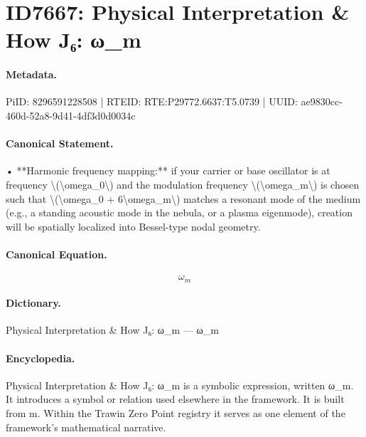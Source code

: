 \section*{ID7667: Physical Interpretation \& How J₆: ω\_m}
\paragraph{Metadata.}
PiID: 8296591228508 | RTEID: RTE:P29772.6637:T5.0739 | UUID: ae9830cc-460d-52a8-9d41-4df3d0d0034c

\paragraph{Canonical Statement.}
• **Harmonic frequency mapping:** if your carrier or base oscillator is at frequency \textbackslash{}(\textbackslash{}omega\_0\textbackslash{}) and the modulation frequency \textbackslash{}(\textbackslash{}omega\_m\textbackslash{}) is chosen such that \textbackslash{}(\textbackslash{}omega\_0 + 6\textbackslash{}omega\_m\textbackslash{}) matches a resonant mode of the medium (e.g., a standing acoustic mode in the nebula, or a plasma eigenmode), creation will be spatially localized into Bessel-type nodal geometry.

\paragraph{Canonical Equation.}
\[
\omega_m
\]

\paragraph{Dictionary.}
Physical Interpretation \& How J₆: ω\_m — ω\_m

\paragraph{Encyclopedia.}
Physical Interpretation \& How J₆: ω\_m is a symbolic expression, written ω\_m. It introduces a symbol or relation used elsewhere in the framework. It is built from m. Within the Trawin Zero Point registry it serves as one element of the framework's mathematical narrative.
